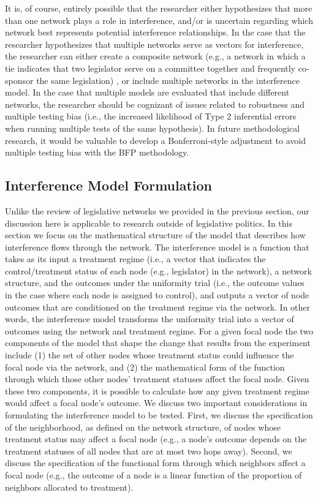 \documentclass[12pt]{article}
\begin{document}
It is, of course, entirely possible that the researcher either hypothesizes that more than one network plays a role in interference, and/or is uncertain regarding which network best represents potential interference relationships. In the case that the researcher hypothesizes that multiple networks serve as vectors for interference,  the researcher can either create a composite network (e.g., a network in which a tie indicates that two legislator serve on a committee together and frequently co-sponsor the same legislation) \citep[e.g.,][]{ansari2011modeling}, or include multiple networks in the interference model.  In the case that multiple models are evaluated that include different networks, the researcher should be cognizant of issues related to robustness and multiple testing bias (i.e., the increased likelihood of Type 2 inferential errors when running multiple tests of the same hypothesis). In future methodological research, it would be valuable to develop a Bonferroni-style adjustment \citep{cabin2000bonferroni} to avoid multiple testing bias with the BFP methodology.

\subsection{Interference Model Formulation}

Unlike the review of legislative networks we provided in the previous section, our discussion here is applicable to research outside of legislative politics. In this section we focus on the mathematical structure of the model that describes how interference flows through the network. The interference model is a function that takes as its input a treatment regime (i.e., a vector that indicates the control/treatment status of each node (e.g., legislator) in the network), a network structure, and the outcomes under the uniformity trial (i.e., the outcome values in the case where each node is assigned to control), and outputs a vector of node outcomes that are conditioned on the treatment regime via the network. In other words, the interference model transforms the uniformity trial into a vector of outcomes using the network and treatment regime. For a given focal node the two components of the model that shape the change that results from the experiment include (1) the set of other nodes whose treatment status could influence the focal node via the network, and (2) the mathematical form of the function through which those other nodes' treatment statuses affect the focal node. Given these two components, it is possible to calculate how any given treatment regime would affect a focal node's outcome. We discuss two important considerations in formulating the interference model to be tested. First, we discuss the specification of the neighborhood, as defined on the network structure, of nodes whose treatment status may affect a focal node (e.g., a node's outcome depends on the treatment statuses of all nodes that are at most two hops away). Second, we discuss the specification of the functional form through which neighbors affect a focal node (e.g., the outcome of a node is a linear function of the proportion of neighbors allocated to treatment).
\end{document}

